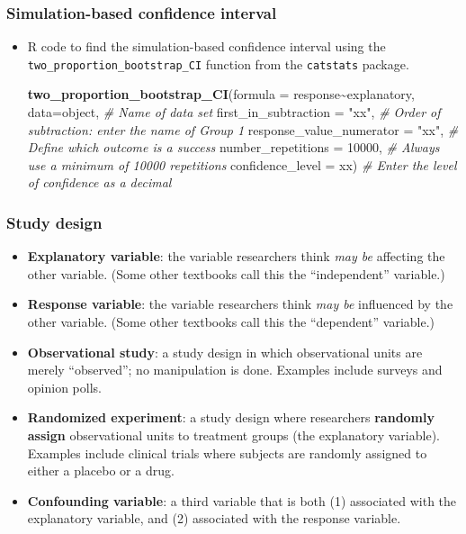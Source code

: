 \documentclass[
]{report}
\newenvironment{Shaded}{\begin{snugshade}}{\end{snugshade}}
\newcommand{\AttributeTok}[1]{\textcolor[rgb]{0.13,0.29,0.53}{#1}}
\newcommand{\CommentTok}[1]{\textcolor[rgb]{0.56,0.35,0.01}{\textit{#1}}}
\newcommand{\DecValTok}[1]{\textcolor[rgb]{0.00,0.00,0.81}{#1}}
\newcommand{\FunctionTok}[1]{\textcolor[rgb]{0.13,0.29,0.53}{\textbf{#1}}}
\newcommand{\NormalTok}[1]{#1}
\newcommand{\SpecialCharTok}[1]{\textcolor[rgb]{0.81,0.36,0.00}{\textbf{#1}}}
\newcommand{\StringTok}[1]{\textcolor[rgb]{0.31,0.60,0.02}{#1}}
\begin{document}
\subsubsection*{Simulation-based confidence interval}\label{simulation-based-confidence-interval-1}

\begin{itemize}
\item
  R code to find the simulation-based confidence interval using the \texttt{two\_proportion\_bootstrap\_CI} function from the \texttt{catstats} package.

\begin{Shaded}
\begin{Highlighting}[]
\FunctionTok{two\_proportion\_bootstrap\_CI}\NormalTok{(}\AttributeTok{formula =}\NormalTok{ response}\SpecialCharTok{\textasciitilde{}}\NormalTok{explanatory, }
    \AttributeTok{data=}\NormalTok{object, }\CommentTok{\# Name of data set}
    \AttributeTok{first\_in\_subtraction =} \StringTok{"xx"}\NormalTok{, }\CommentTok{\# Order of subtraction: enter the name of Group 1}
    \AttributeTok{response\_value\_numerator =} \StringTok{"xx"}\NormalTok{, }\CommentTok{\# Define which outcome is a success }
    \AttributeTok{number\_repetitions =} \DecValTok{10000}\NormalTok{, }\CommentTok{\# Always use a minimum of 10000 repetitions}
    \AttributeTok{confidence\_level =}\NormalTok{ xx) }\CommentTok{\# Enter the level of confidence as a decimal}
\end{Highlighting}
\end{Shaded}
\end{itemize}

\subsubsection*{Study design}\label{study-design}

\begin{itemize}
\item
  \textbf{Explanatory variable}: the variable researchers think \emph{may be} affecting the other variable. (Some other textbooks call this the ``independent'' variable.)
\item
  \textbf{Response variable}: the variable researchers think \emph{may be} influenced by the other variable. (Some other textbooks call this the ``dependent'' variable.)
\item
  \textbf{Observational study}: a study design in which observational units are merely ``observed''; no manipulation is done. Examples include surveys and opinion polls.
\item
  \textbf{Randomized experiment}: a study design where researchers \textbf{randomly assign} observational units to treatment groups (the explanatory variable). Examples include clinical trials where subjects are randomly assigned to either a placebo or a drug.
\item
  \textbf{Confounding variable}: a third variable that is both (1) associated with the explanatory variable, and (2) associated with the response variable.
\end{itemize}
\end{document}
